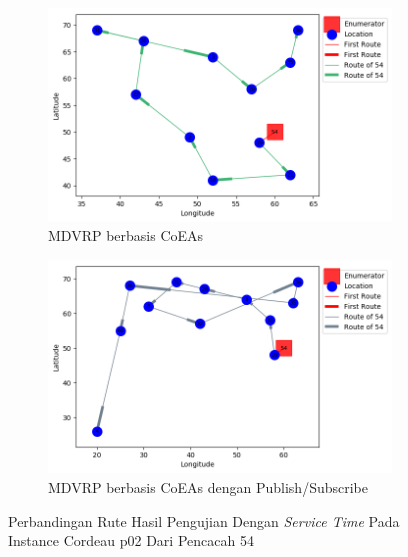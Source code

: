 \begin{figure}[H]
	\centering
	\begin{subfigure}[t]{\textwidth}
		\centering
		\includegraphics[width=\textwidth]{Resources/Images/cordeau_p02_tw/cordeau_p02_tw_54_coes}
		\caption{MDVRP berbasis CoEAs}
		\label{fig:cordeau_p02_tw_54_coes}
	\end{subfigure}
	\begin{subfigure}[t]{\textwidth}
		\centering
		\includegraphics[width=\textwidth]{Resources/Images/cordeau_p02_tw/cordeau_p02_tw_54_pubsub_coes}
		\caption{MDVRP berbasis CoEAs dengan Publish/Subscribe}
		\label{fig:cordeau_p02_tw_54_pubsub_coes}
	\end{subfigure}
	\caption{Perbandingan Rute Hasil Pengujian Dengan \textit{Service Time} Pada Instance Cordeau p02 Dari Pencacah 54}
	\label{fig:cordeau_p02_tw_54}
\end{figure}


